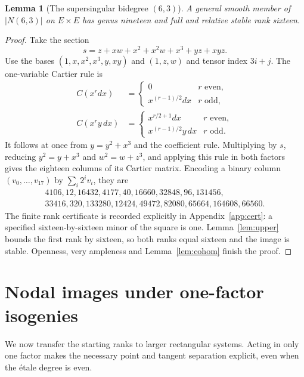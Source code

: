 \documentclass[11pt]{article}
\newtheorem{lemma}[theorem]{Lemma}
\theoremstyle{definition}\newtheorem{definition}[theorem]{Definition}
\theoremstyle{remark}\newtheorem{remark}[theorem]{Remark}
\begin{document}
\begin{lemma}[The supersingular bidegree $(6,3)$]\label{lem:ss-six}
A general smooth member of $|N(6,3)|$ on $E\times E$ has genus nineteen and full and relative stable rank sixteen.
\end{lemma}
\begin{proof}
Take the section
\[
 s=z+xw+x^2+x^2w+x^3+yz+xyz.
\]
Use the bases $(1,x,x^2,x^3,y,xy)$ and $(1,z,w)$ and tensor index $3i+j$. The one-variable Cartier rule is
\begin{align*}
 C(x^r dx)&=\begin{cases}0&r\text{ even},\\x^{(r-1)/2}dx&r\text{ odd},\end{cases}\\
 C(x^r y\,dx)&=\begin{cases}x^{r/2+1}dx&r\text{ even},\\x^{(r-1)/2}y\,dx&r\text{ odd}.
 \end{cases}
\end{align*}
It follows at once from $y=y^2+x^3$ and the coefficient rule. Multiplying by $s$, reducing $y^2=y+x^3$ and $w^2=w+z^3$, and applying this rule in both factors gives the eighteen columns of its Cartier matrix. Encoding a binary column $(v_0,\ldots,v_{17})$ by $\sum_i2^iv_i$, they are
\[
\begin{gathered}
4106,12,16432,4177,40,16660,32848,96,131456,\\
33416,320,133280,12424,49472,82080,65664,164608,66560.
\end{gathered}
\]
The finite rank certificate is recorded explicitly in Appendix~\ref{app:cert}: a specified sixteen-by-sixteen minor of the square is one. Lemma~\ref{lem:upper} bounds the first rank by sixteen, so both ranks equal sixteen and the image is stable. Openness, very ampleness and Lemma~\ref{lem:cohom} finish the proof.
\end{proof}



\section{Nodal images under one-factor isogenies}\label{sec:norm}

We now transfer the starting ranks to larger rectangular systems. Acting in only one factor makes the necessary point and tangent separation explicit, even when the \'etale degree is even.
\end{document}
